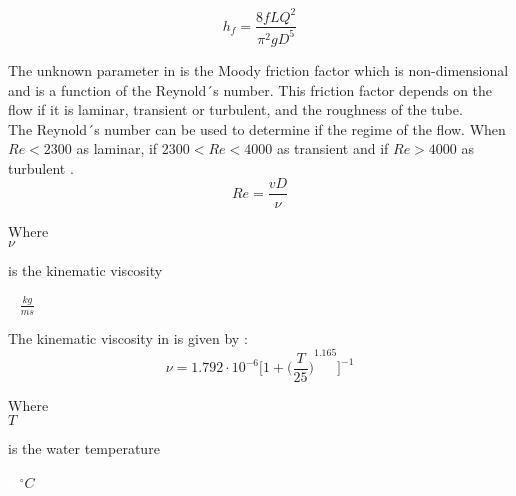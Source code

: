 \begin{equation}
  h_f = \frac{8fLQ^2}{\pi^{2}gD^5}
  \label{DarcyWeisbach}
\end{equation} 
 
 The unknown parameter in  is the Moody friction factor 
 which is non-dimensional and is a function of the Reynold´s number. This friction factor depends on the flow if it is laminar, transient or turbulent, and the roughness of the tube. \\
 
 
The Reynold´s number can be used to determine if the regime of the flow. When $Re<2300$ as laminar, if $2300<Re<4000$ as transient and if
$Re>4000$ as turbulent \cite{Intro_Fluid}. 
\begin{equation}
   Re = \frac{vD}{\nu}
   \label{Reynolds}
 \end{equation}
 
  \begin{minipage}[t]{0.20\textwidth}
Where\\
\hspace*{8mm} $\nu$ 
\end{minipage}
\begin{minipage}[t]{0.68\textwidth}
\vspace*{2mm}
is the kinematic viscosity

\end{minipage}
\begin{minipage}[t]{0.10\textwidth}
\vspace*{2mm}
\textcolor{White}{te}$\unit{\frac{kg}{ms}}$
\end{minipage}

The kinematic viscosity in \cite{Design_Water} is given by :
\begin{equation}
  \nu = 1.792 \cdot 10^{-6} \bigg[1+{\bigg(\frac{T}{25}\bigg)}^{1.165} \bigg]^{-1}
\end{equation}

  \begin{minipage}[t]{0.20\textwidth}
Where\\
\hspace*{8mm} $T$ 
\end{minipage}
\begin{minipage}[t]{0.68\textwidth}
\vspace*{2mm}
is the water temperature  
 \end{minipage}
\begin{minipage}[t]{0.10\textwidth}
\vspace*{2mm}
\textcolor{White}{te}$\unit{^{\circ} C}$
\end{minipage}

